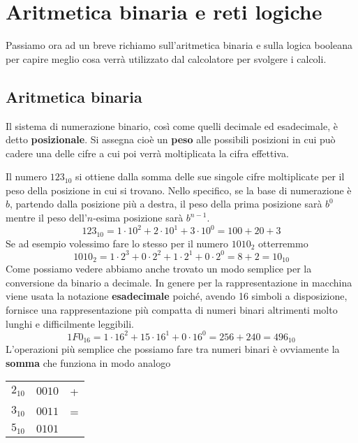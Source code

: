 \chapter{Aritmetica binaria e reti logiche}
Passiamo ora ad un breve richiamo sull'aritmetica binaria e sulla logica booleana per capire meglio
cosa verrà utilizzato dal calcolatore per svolgere i calcoli.

\section{Aritmetica binaria}
Il sistema di numerazione binario, così come quelli decimale ed esadecimale, è detto
\textbf{posizionale}. Si assegna cioè un \textbf{peso} alle possibili posizioni in cui può cadere
una delle cifre a cui poi verrà moltiplicata la cifra effettiva.

Il numero $123_{10}$ si ottiene dalla somma delle sue singole cifre moltiplicate per il peso della
posizione in cui si trovano. Nello specifico, se la base di numerazione è $b$, partendo dalla
posizione più a destra, il peso della prima posizione sarà $b^0$ mentre il peso dell'$n$-esima
posizione sarà $b^{n-1}$.
\[ 123_{10} = 1 \cdot 10^2 + 2 \cdot 10^1 + 3 \cdot 10^0 = 100 + 20 + 3 \]
Se ad esempio volessimo fare lo stesso per il numero $1010_2$ otterremmo
\[ 1010_2 = 1 \cdot 2^3 + 0 \cdot 2^2 + 1 \cdot 2^1 + 0 \cdot 2^0 = 8 + 2 = 10_{10} \]
Come possiamo vedere abbiamo anche trovato un modo semplice per la conversione da binario a
decimale. In genere per la rappresentazione in macchina viene usata la notazione
\textbf{esadecimale} poiché, avendo 16 simboli a disposizione, fornisce una rappresentazione più
compatta di numeri binari altrimenti molto lunghi e difficilmente leggibili.
\[ 1F0_{16} = 1 \cdot 16^2 + 15 \cdot 16^1 + 0 \cdot 16^0 = 256 + 240 = 496_{10} \]
L'operazioni più semplice che possiamo fare tra numeri binari è ovviamente la \textbf{somma} che
funziona in modo analogo
\begin{center}
	\begin{tabular}{c | c c}
		$2_{10}$ & $0010$ & + \\
		$3_{10}$ & $0011$ & = \\ \hline
		$5_{10}$ & $0101$
	\end{tabular}
\end{center}

